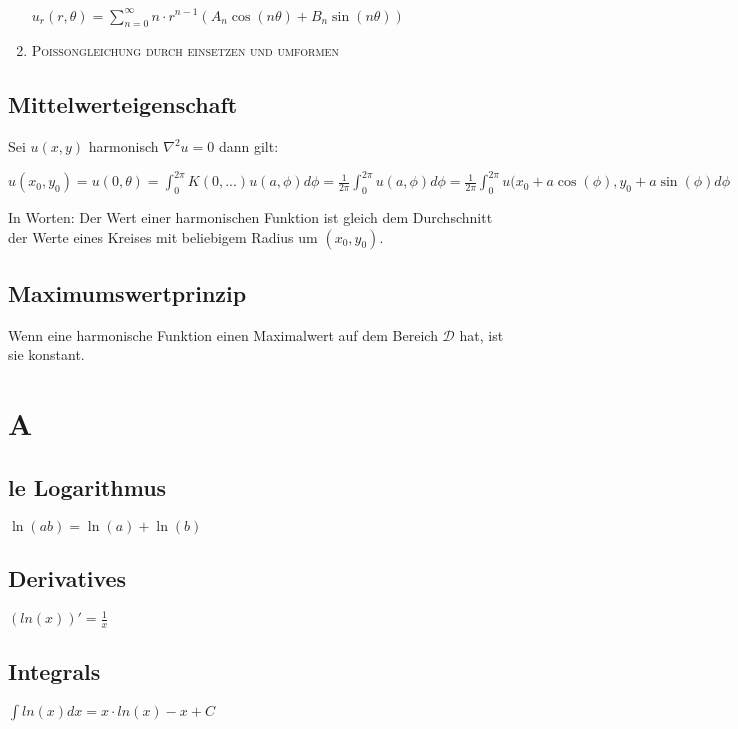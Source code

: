 \documentclass[10pt,a4paper]{scrartcl}
\begin{document}
\begin{multicols*}{3}
\begin{enumerate}
	$u_r(r,\theta)=\sum_{n=0}^\infty{n\cdot r^{n-1}(A_n\cos(n\theta)+B_n\sin(n\theta))}$
	
	\item \scshape{Poissongleichung} durch einsetzen und umformen
	
	
	
	\end{enumerate}
	
	\finn	
	
	\subsection{Mittelwerteigenschaft}
	Sei $u(x,y)$ harmonisch \dahe $\nabla^2 u = 0$ dann gilt:
	
	 	
	
	$u(x_0,y_0)=u(0,\theta)=\int_0^{2\pi}{K(0,...)u(a,\phi)d\phi}=\frac{1}{2\pi}\int_0^{2\pi}{u(a,\phi)d\phi}=\frac{1}{2\pi}\int_0^{2\pi}{u(x_0+a\cos(\phi),y_0+a\sin(\phi)d\phi}$
	
	 
	
	In Worten: Der Wert einer harmonischen Funktion ist gleich dem Durchschnitt der Werte eines Kreises mit beliebigem Radius um $(x_0,y_0)$.
	
	\subsection{Maximumswertprinzip}
	
	Wenn eine harmonische Funktion einen Maximalwert auf dem Bereich $\mathscr{D}$ hat, ist sie konstant.	
	
	\section{A}
	\subsection{le Logarithmus}
	$\ln(ab)=\ln(a)+\ln(b)$
	\subsection{Derivatives}
	$(ln(x))'=\frac{1}{x}$
	\subsection{Integrals}	
	$\int{ln(x)}dx =x\cdot ln(x) -x + C$
	

\end{multicols*}
\end{document}
